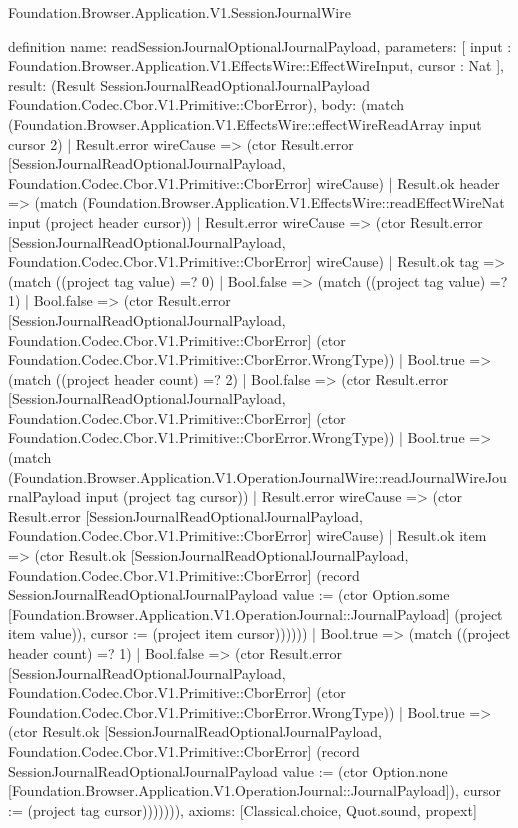 \begin{lexlean}{Foundation.Browser.Application.V1.SessionJournalWire}
\begin{semanticmodule}
definition{
  name: readSessionJournalOptionalJournalPayload,
  parameters: [
    input : Foundation.Browser.Application.V1.EffectsWire::EffectWireInput,
    cursor : Nat
  ],
  result: (Result SessionJournalReadOptionalJournalPayload Foundation.Codec.Cbor.V1.Primitive::CborError),
  body: (match (Foundation.Browser.Application.V1.EffectsWire::effectWireReadArray input cursor 2)
    | Result.error wireCause => (ctor Result.error [SessionJournalReadOptionalJournalPayload, Foundation.Codec.Cbor.V1.Primitive::CborError] wireCause)
    | Result.ok header => (match (Foundation.Browser.Application.V1.EffectsWire::readEffectWireNat input (project header cursor))
      | Result.error wireCause => (ctor Result.error [SessionJournalReadOptionalJournalPayload, Foundation.Codec.Cbor.V1.Primitive::CborError] wireCause)
      | Result.ok tag => (match ((project tag value) =? 0)
        | Bool.false => (match ((project tag value) =? 1)
          | Bool.false => (ctor Result.error [SessionJournalReadOptionalJournalPayload, Foundation.Codec.Cbor.V1.Primitive::CborError] (ctor Foundation.Codec.Cbor.V1.Primitive::CborError.WrongType))
          | Bool.true => (match ((project header count) =? 2)
            | Bool.false => (ctor Result.error [SessionJournalReadOptionalJournalPayload, Foundation.Codec.Cbor.V1.Primitive::CborError] (ctor Foundation.Codec.Cbor.V1.Primitive::CborError.WrongType))
            | Bool.true => (match (Foundation.Browser.Application.V1.OperationJournalWire::readJournalWireJournalPayload input (project tag cursor))
              | Result.error wireCause => (ctor Result.error [SessionJournalReadOptionalJournalPayload, Foundation.Codec.Cbor.V1.Primitive::CborError] wireCause)
              | Result.ok item => (ctor Result.ok [SessionJournalReadOptionalJournalPayload, Foundation.Codec.Cbor.V1.Primitive::CborError] (record SessionJournalReadOptionalJournalPayload {value := (ctor Option.some [Foundation.Browser.Application.V1.OperationJournal::JournalPayload] (project item value)), cursor := (project item cursor)})))))
        | Bool.true => (match ((project header count) =? 1)
          | Bool.false => (ctor Result.error [SessionJournalReadOptionalJournalPayload, Foundation.Codec.Cbor.V1.Primitive::CborError] (ctor Foundation.Codec.Cbor.V1.Primitive::CborError.WrongType))
          | Bool.true => (ctor Result.ok [SessionJournalReadOptionalJournalPayload, Foundation.Codec.Cbor.V1.Primitive::CborError] (record SessionJournalReadOptionalJournalPayload {value := (ctor Option.none [Foundation.Browser.Application.V1.OperationJournal::JournalPayload]), cursor := (project tag cursor)})))))),
  axioms: [Classical.choice, Quot.sound, propext]
}


\end{semanticmodule}
\end{lexlean}
